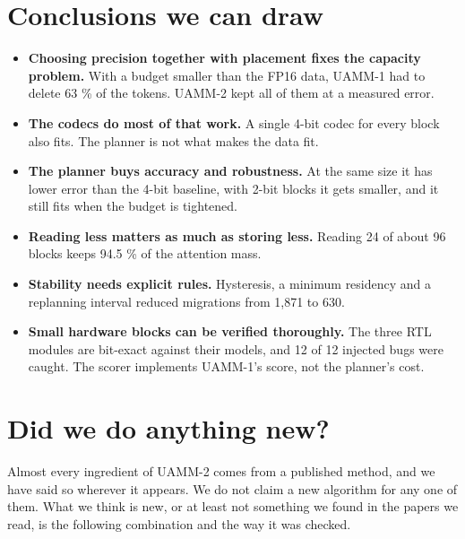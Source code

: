\documentclass[12pt,a4paper]{report}
\begin{document}
\section{Conclusions we can draw}
\begin{itemize}
\item \textbf{Choosing precision together with placement fixes the capacity problem.} With a budget smaller than the FP16 data, UAMM-1 had to delete 63 \% of the tokens. UAMM-2 kept all of them at a measured error.
\item \textbf{The codecs do most of that work.} A single 4-bit codec for every block also fits. The planner is not what makes the data fit.
\item \textbf{The planner buys accuracy and robustness.} At the same size it has lower error than the 4-bit baseline, with 2-bit blocks it gets smaller, and it still fits when the budget is tightened.
\item \textbf{Reading less matters as much as storing less.} Reading 24 of about 96 blocks keeps 94.5 \% of the attention mass.
\item \textbf{Stability needs explicit rules.} Hysteresis, a minimum residency and a replanning interval reduced migrations from 1,871 to 630.
\item \textbf{Small hardware blocks can be verified thoroughly.} The three RTL modules are bit-exact against their models, and 12 of 12 injected bugs were caught. The scorer implements UAMM-1's score, not the planner's cost.
\end{itemize}
\section{Did we do anything new?}
Almost every ingredient of UAMM-2 comes from a published method, and we have said so wherever it appears. We do not claim a new algorithm for any one of them. What we think is new, or at least not something we found in the papers we read, is the following combination and the way it was checked.
\end{document}
